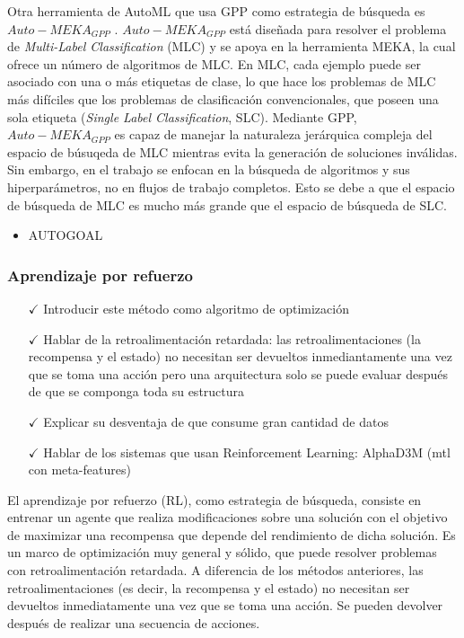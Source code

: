 Otra herramienta de AutoML que usa GPP como estrategia de búsqueda es $Auto-MEKA_{GPP}$ \cite{de2018automated}. $Auto-MEKA_{GPP}$ está diseñada para resolver el problema de \textit{Multi-Label Classification} (MLC) y se apoya en la herramienta MEKA, la cual ofrece un número de algoritmos de MLC. En MLC, cada ejemplo puede ser asociado con una o más etiquetas de clase, lo que hace los problemas de MLC más difíciles que los problemas de clasificación convencionales, que poseen una sola etiqueta (\textit{Single Label Classification}, SLC). Mediante GPP, $Auto-MEKA_{GPP}$ es capaz de manejar la naturaleza jerárquica compleja del espacio de búsuqeda de MLC mientras evita la generación de soluciones inválidas. Sin embargo, en el trabajo se enfocan en la búsqueda de algoritmos y sus hiperparámetros, no en flujos de trabajo completos. Esto se debe a que el espacio de búsqueda de MLC es mucho más grande que el espacio de búsqueda de SLC.

\begin{itemize}
	\item AUTOGOAL
\end{itemize}

\subsubsection{Aprendizaje por refuerzo}

\begin{itemize}
	\item[$\checkmark$] Introducir este método como algoritmo de optimización
	\item[$\checkmark$] Hablar de la retroalimentación retardada: las retroalimentaciones (la recompensa y el estado) no necesitan ser devueltos inmediantamente una vez que se toma una acción pero una arquitectura solo se puede evaluar después de que se componga toda su estructura
	\item[$\checkmark$] Explicar su desventaja de que consume gran cantidad de datos
	\item[$\checkmark$] Hablar de los sistemas que usan Reinforcement Learning: AlphaD3M (mtl con meta-features)
\end{itemize}

El aprendizaje por refuerzo (RL), como estrategia de búsqueda, consiste en entrenar un agente que realiza modificaciones sobre una solución con el objetivo de maximizar una recompensa que depende del rendimiento de dicha solución. Es un marco de optimización muy general y sólido, que puede resolver problemas con retroalimentación retardada. A diferencia de los métodos anteriores, las retroalimentaciones (es decir, la recompensa y el estado) no necesitan ser devueltos inmediatamente una vez que se toma una acción. Se pueden devolver después de realizar una secuencia de acciones. 

